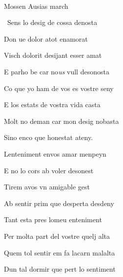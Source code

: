 \documentclass[12pt]{article}
\renewcommand{\espaiAbansEtiquetaPoema}{\vspace{0ex}}
\begin{document}
\begin{estrofa}

\espaiAbansEtiquetaPoema

\\

\begin{rubrica}

\textsection{} Mossen Ausias march \textsection{}

\end{rubrica}

\end{estrofa}


\begin{estrofa}

 \textparagraph\  Sens lo desig de cossa denosta

 Don ue dolor atot enamorat

 Visch dolorit desijant esser amat

 E parho be car no\textit{us} vull desonosta

 Co que yo ham de vos es vostre seny

 E los estats de vostra vida casta

 Molt no deman car mon desig nobasta

 Sino enco que honestat ateny.

\end{estrofa}



\begin{estrofa}

 Lenteniment envos amar menpeyn

 E no lo cors ab voler desonest

 Tirem avos vn amigable gest

 Ab sentir prim que desperta desdeny

 Tant esta pres lomeu enteniment

 Per molta part del vostre quelj alta

 Quem tol sentir em fa lacarn malalta

 Dun tal dormir que pert lo sentiment

\end{estrofa}
\end{document}
